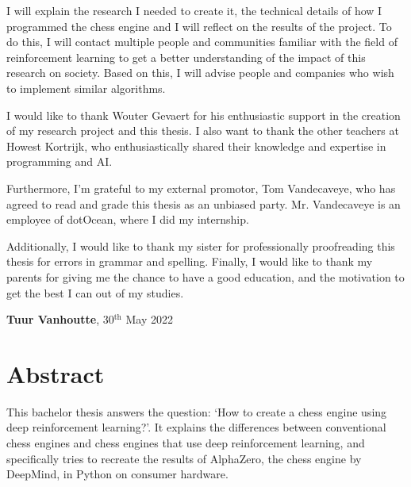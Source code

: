 \documentclass{article}
\begin{document}
I will explain the research I needed to create it, the technical details of how I programmed the
chess engine and I will reflect on the results of the project. To do this, I will contact 
multiple people and communities familiar with the field of reinforcement learning to get a better understanding of the
impact of this research on society. Based on this, I will advise people and companies who 
wish to implement similar algorithms.

I would like to thank Wouter Gevaert for his enthusiastic support in the creation of my research project 
and this thesis. I also want to thank the other teachers at Howest Kortrijk, who enthusiastically shared their knowledge
and expertise in programming and AI.

Furthermore, I'm grateful to my external promotor, Tom Vandecaveye, who has agreed to read and grade
this thesis as an unbiased party. Mr. Vandecaveye is an employee of dotOcean, where I did my internship.

Additionally, I would like to thank my sister for professionally proofreading this thesis for 
errors in grammar and spelling.
Finally, I would like to thank my parents for giving me the chance to have a good education, and 
the motivation to get the best I can out of my studies.

\vspace{3em}

\begin{center}
    \textbf{Tuur Vanhoutte}, 30$^{\text{th}}$ May 2022
\end{center}

\newpage
\thispagestyle{empty}
\mbox{}
\newpage

\section*{Abstract}



This bachelor thesis answers the question: `How to create a chess engine using deep reinforcement learning?'.
It explains the differences between conventional chess engines and chess engines that use deep reinforcement learning, and
specifically tries to recreate the results of AlphaZero, the chess engine by DeepMind, in Python on consumer hardware. 
\end{document}
